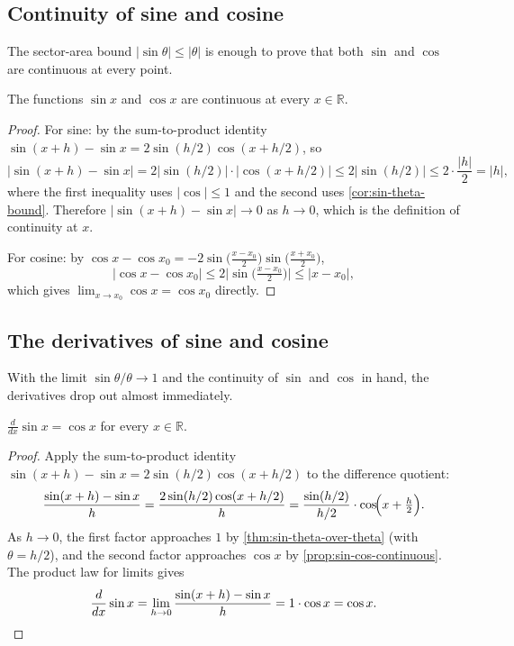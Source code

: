 \subsection{Continuity of sine and cosine}

The sector-area bound \(\lvert \sin \theta \rvert \leq \lvert \theta \rvert\) is enough to prove that both \(\sin\) and \(\cos\) are continuous at every point.

\begin{proposition}\label{prop:sin-cos-continuous}
The functions \(\sin x\) and \(\cos x\) are continuous at every \(x \in \mathbb{R}\).
\end{proposition}

\begin{proof}
For sine: by the sum-to-product identity \(\sin(x + h) - \sin x = 2 \sin(h/2) \cos(x + h/2)\), so
\[
\bigl\lvert \sin(x + h) - \sin x \bigr\rvert
= 2 \bigl\lvert \sin(h/2) \bigr\rvert \cdot \bigl\lvert \cos(x + h/2) \bigr\rvert
\leq 2 \bigl\lvert \sin(h/2) \bigr\rvert
\leq 2 \cdot \frac{\lvert h \rvert}{2}
= \lvert h \rvert,
\]
where the first inequality uses \(\lvert \cos \rvert \leq 1\) and the second uses \cref{cor:sin-theta-bound}. Therefore \(\lvert \sin(x + h) - \sin x \rvert \to 0\) as \(h \to 0\), which is the definition of continuity at \(x\).

For cosine: by \(\cos x - \cos x_{0} = -2 \sin\bigl(\tfrac{x - x_{0}}{2}\bigr) \sin\bigl(\tfrac{x + x_{0}}{2}\bigr)\),
\[
\bigl\lvert \cos x - \cos x_{0} \bigr\rvert
\leq 2 \bigl\lvert \sin\bigl(\tfrac{x - x_{0}}{2}\bigr) \bigr\rvert
\leq \lvert x - x_{0} \rvert,
\]
which gives \(\lim_{x \to x_{0}} \cos x = \cos x_{0}\) directly.
\end{proof}

\subsection{The derivatives of sine and cosine}

With the limit \(\sin \theta / \theta \to 1\) and the continuity of \(\sin\) and \(\cos\) in hand, the derivatives drop out almost immediately.

\begin{theorem}\label{thm:derivative-sin}
\(\displaystyle \frac{d}{dx} \sin x = \cos x\) for every \(x \in \mathbb{R}\).
\end{theorem}

\begin{proof}
Apply the sum-to-product identity \(\sin(x + h) - \sin x = 2 \sin(h/2) \cos(x + h/2)\) to the difference quotient:
\[
\frac{\sin(x + h) - \sin x}{h}
= \frac{2 \sin(h/2) \cos(x + h/2)}{h}
= \frac{\sin(h/2)}{h/2} \cdot \cos\!\Bigl(x + \tfrac{h}{2}\Bigr).
\]
As \(h \to 0\), the first factor approaches \(1\) by \cref{thm:sin-theta-over-theta} (with \(\theta = h/2\)), and the second factor approaches \(\cos x\) by \cref{prop:sin-cos-continuous}. The product law for limits gives
\[
\frac{d}{dx} \sin x = \lim_{h \to 0} \frac{\sin(x + h) - \sin x}{h} = 1 \cdot \cos x = \cos x. \qedhere
\]
\end{proof}

